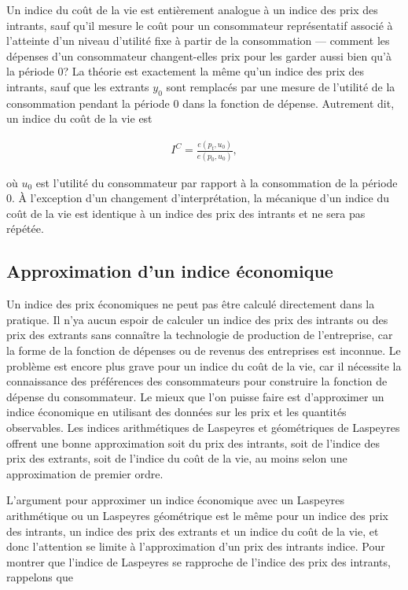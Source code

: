 \documentclass[
]{article}
\begin{document}
Un indice du coût de la vie est entièrement analogue à un indice des prix des intrants, sauf qu'il mesure le coût pour un consommateur représentatif associé à l'atteinte d'un niveau d'utilité fixe à partir de la consommation --- comment les dépenses d'un consommateur changent-elles prix pour les garder aussi bien qu'à la période 0? La théorie est exactement la même qu'un indice des prix des intrants, sauf que les extrants \(y_0\) sont remplacés par une mesure de l'utilité de la consommation pendant la période 0 dans la fonction de dépense. Autrement dit, un indice du coût de la vie est

\begin{align*}
I^{C} = \frac{e (p_{t}, u_{0})}{e (p_{0}, u_{0})},
\end{align*}

où \(u_{0}\) est l'utilité du consommateur par rapport à la consommation de la période 0. À l'exception d'un changement d'interprétation, la mécanique d'un indice du coût de la vie est identique à un indice des prix des intrants et ne sera pas répétée.

\hypertarget{approximation-dun-indice-uxe9conomique}{%
\subsection{Approximation d'un indice économique}\label{approximation-dun-indice-uxe9conomique}}

Un indice des prix économiques ne peut pas être calculé directement dans la pratique. Il n'ya aucun espoir de calculer un indice des prix des intrants ou des prix des extrants sans connaître la technologie de production de l'entreprise, car la forme de la fonction de dépenses ou de revenus des entreprises est inconnue. Le problème est encore plus grave pour un indice du coût de la vie, car il nécessite la connaissance des préférences des consommateurs pour construire la fonction de dépense du consommateur. Le mieux que l'on puisse faire est d'approximer un indice économique en utilisant des données sur les prix et les quantités observables. Les indices arithmétiques de Laspeyres et géométriques de Laspeyres offrent une bonne approximation soit du prix des intrants, soit de l'indice des prix des extrants, soit de l'indice du coût de la vie, au moins selon une approximation de premier ordre.

L'argument pour approximer un indice économique avec un Laspeyres arithmétique ou un Laspeyres géométrique est le même pour un indice des prix des intrants, un indice des prix des extrants et un indice du coût de la vie, et donc l'attention se limite à l'approximation d'un prix des intrants indice. Pour montrer que l'indice de Laspeyres se rapproche de l'indice des prix des intrants, rappelons que
\end{document}
